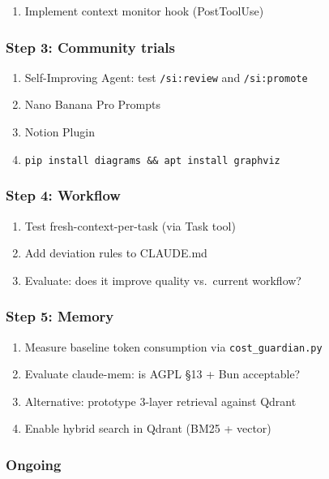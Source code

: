 \documentclass[11pt,a4paper]{article}
\begin{document}
\begin{enumerate}[resume]
  \item Implement context monitor hook (PostToolUse)
\end{enumerate}

\subsubsection{Step 3: Community trials}

\begin{enumerate}[resume]
  \item Self-Improving Agent: test \texttt{/si:review} and \texttt{/si:promote}
  \item Nano Banana Pro Prompts
  \item Notion Plugin
  \item \texttt{pip install diagrams \&\& apt install graphviz}
\end{enumerate}

\subsubsection{Step 4: Workflow}

\begin{enumerate}[resume]
  \item Test fresh-context-per-task (via Task tool)
  \item Add deviation rules to CLAUDE.md
  \item Evaluate: does it improve quality vs.\ current workflow?
\end{enumerate}

\subsubsection{Step 5: Memory}

\begin{enumerate}[resume]
  \item Measure baseline token consumption via \texttt{cost\_guardian.py}
  \item Evaluate claude-mem: is AGPL \S 13 + Bun acceptable?
  \item Alternative: prototype 3-layer retrieval against Qdrant
  \item Enable hybrid search in Qdrant (BM25 + vector)
\end{enumerate}

\subsubsection{Ongoing}
\end{document}
